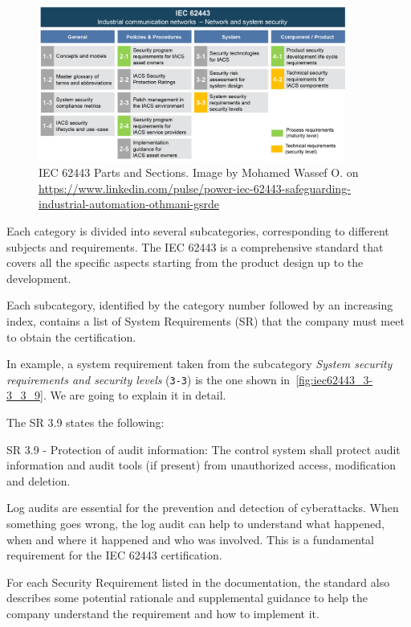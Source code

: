 \begin{figure}[t]
  \centering
  \includegraphics[width=0.9\textwidth]{chapters/04/assets/iec62443.png}
  \caption[IEC 62443 Parts and Sections. Image by Mohamed Wassef O.]{IEC 62443 Parts and Sections. Image by Mohamed Wassef O. on \url{https://www.linkedin.com/pulse/power-iec-62443-safeguarding-industrial-automation-othmani-gsrde}}
  \label{fig:iec-62443}
\end{figure}

Each category is divided into several subcategories, corresponding to different subjects and requirements. The IEC 62443 is a comprehensive standard that covers all the specific aspects starting from the product design up to the development.

Each subcategory, identified by the category number followed by an increasing index, contains a list of System Requirements (SR) that the company must meet to obtain the certification.

In example, a system requirement taken from the subcategory \textit{System security requirements and security levels} (\texttt{3-3}) is the one shown in~\cref{fig:iec62443_3-3_3_9}. We are going to explain it in detail.

The SR 3.9 states the following:
\begin{mdframed}
  SR 3.9 - Protection of audit information: The control system shall protect audit information and audit tools (if present) from unauthorized access, modification and deletion.
\end{mdframed}\label{sr:3-3_3-9}

Log audits are essential for the prevention and detection of cyberattacks. When something goes wrong, the log audit can help to understand what happened, when and where it happened and who was involved. This is a fundamental requirement for the IEC 62443 certification.

For each Security Requirement listed in the documentation, the standard also describes some potential rationale and supplemental guidance to help the company understand the requirement and how to implement it.

